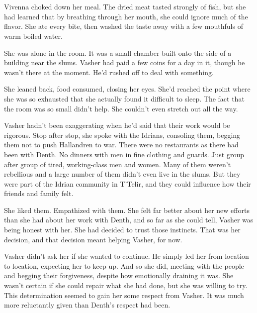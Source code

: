 \chapter{}

Vivenna choked down her meal. The dried meat tasted strongly of fish, but she had learned that by breathing through her mouth, she could ignore much of the flavor. She ate every bite, then washed the taste away with a few mouthfuls of warm boiled water.

She was alone in the room. It was a small chamber built onto the side of a building near the slums. Vasher had paid a few coins for a day in it, though he wasn’t there at the moment. He’d rushed off to deal with something.

She leaned back, food consumed, closing her eyes. She’d reached the point where she was so exhausted that she actually found it difficult to sleep. The fact that the room was so small didn’t help. She couldn’t even stretch out all the way.

Vasher hadn’t been exaggerating when he’d said that their work would be rigorous. Stop after stop, she spoke with the Idrians, consoling them, begging them not to push Hallandren to war. There were no restaurants as there had been with Denth. No dinners with men in fine clothing and guards. Just group after group of tired, working-class men and women. Many of them weren’t rebellious and a large number of them didn’t even live in the slums. But they were part of the Idrian community in T’Telir, and they could influence how their friends and family felt.

She liked them. Empathized with them. She felt far better about her new efforts than she had about her work with Denth, and so far as she could tell, Vasher was being honest with her. She had decided to trust those instincts. That was her decision, and that decision meant helping Vasher, for now.

Vasher didn’t ask her if she wanted to continue. He simply led her from location to location, expecting her to keep up. And so she did, meeting with the people and begging their forgiveness, despite how emotionally draining it was. She wasn’t certain if she could repair what she had done, but she was willing to try. This determination seemed to gain her some respect from Vasher. It was much more reluctantly given than Denth’s respect had been.

